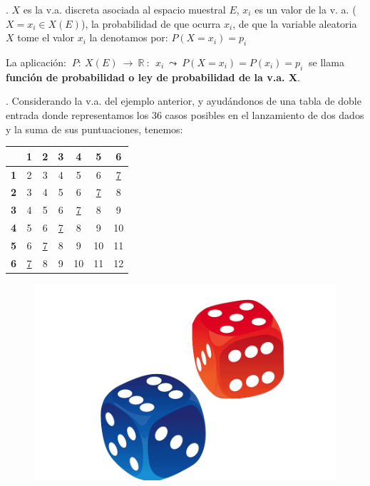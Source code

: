 \begin{definition}
.	$X$ es la v.a. discreta asociada al espacio muestral $E$, $x_i$ es un valor de la v. a. ($X=x_i\in X(E)$), la probabilidad de que ocurra $x_i$, de que la variable aleatoria $X$ tome el valor $x_i$ la denotamos por:
$P(X=x_i)=p_i$

\vspace{2mm} La aplicación: $\ P:\ X(E) \ \to \ \mathbb R \ : \ \ x_i \  \leadsto \ P(X=x_i)=P(x_i)=p_i\ $ 	  se llama \textbf{función de probabilidad o ley de probabilidad de la v.a. X}.
\end{definition}

\begin{example}
.	Considerando la v.a. del ejemplo anterior, y ayudándonos de una tabla de doble entrada donde representamos los 36 casos posibles en el lanzamiento de dos dados y la suma de sus puntuaciones, tenemos:	

\begin{multicols}{2}
\begin{table}[H]
\small
\centering
\begin{tabular}{c|c|c|c|c|c|c|}
 & {\color[HTML]{FE0000} \textbf{1}} & {\color[HTML]{FE0000} \textbf{2}} & {\color[HTML]{FE0000} \textbf{3}} & {\color[HTML]{FE0000} \textbf{4}} & {\color[HTML]{FE0000} \textbf{5}} & {\color[HTML]{FE0000} \textbf{6}} \\ \hline
{\color[HTML]{3531FF} \textbf{1}} & 2 & 3 & 4 & 5 & 6 & \underline{7} \\ \hline
{\color[HTML]{3531FF} \textbf{2}} & 3 & 4 & 5 & 6 & \underline{7} & 8 \\ \hline
{\color[HTML]{3531FF} \textbf{3}} & 4 & 5 & 6 & \underline{7} & 8 & 9 \\ \hline
{\color[HTML]{3531FF} \textbf{4}} & 5 & 6 & \underline{7} & 8 & 9 & 10 \\ \hline
{\color[HTML]{3531FF} \textbf{5}} & 6 & \underline{7} & 8 & 9 & 10 & 11 \\ \hline
{\color[HTML]{3531FF} \textbf{6}} & \underline{7} & 8 & 9 & 10 & 11 & 12 \\ \cline{2-7} 
\end{tabular}
\end{table}
	\begin{figure}[H]
			\centering
			\includegraphics[width=.4\textwidth]{imagenes/imagenes02/T02IM15.png}
	\end{figure}
\end{multicols}


\end{example}
